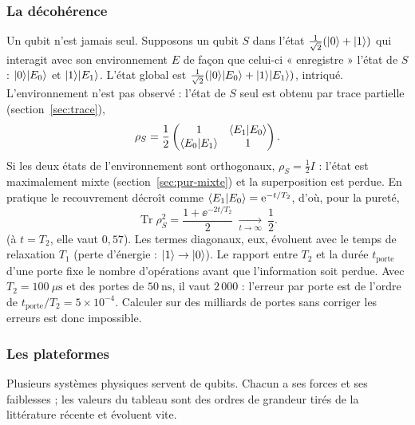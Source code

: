 \subsubsection{La décohérence}

Un qubit n'est jamais seul. Supposons un qubit $S$ dans l'état $\frac{1}{\sqrt2}(|0\rangle+|1\rangle)$ qui interagit
avec son environnement $E$ de façon que celui-ci « enregistre » l'état de $S$ : $|0\rangle|E_0\rangle$ et $|1\rangle|E_1\rangle$.
L'état global est $\frac{1}{\sqrt2}(|0\rangle|E_0\rangle+|1\rangle|E_1\rangle)$, intriqué. L'environnement n'est pas observé : l'état de $S$ seul
est obtenu par trace partielle (section~\ref{sec:trace}),
\[
  \rho_S=\frac12\begin{pmatrix}1&\langle E_1|E_0\rangle\\\langle E_0|E_1\rangle&1\end{pmatrix}.
\]
Si les deux états de l'environnement sont orthogonaux, $\rho_S=\frac12 I$ : l'état est maximalement mixte
(section~\ref{sec:pur-mixte}) et la superposition est perdue. En pratique le recouvrement décroît
comme $\langle E_1|E_0\rangle=\mathrm{e}^{-t/T_2}$, d'où, pour la pureté,
\[
  \operatorname{Tr}\rho_S^2=\frac{1+\ee^{-2t/T_2}}{2}\ \xrightarrow[t\to\infty]{}\ \frac12 .
\]
(à $t=T_2$, elle vaut $0{,}57$). Les termes diagonaux, eux, évoluent avec le temps de relaxation $T_1$ (perte d'énergie : $|1\rangle\to|0\rangle$). Le rapport
entre $T_2$ et la durée $t_{\mathrm{porte}}$ d'une porte fixe le nombre d'opérations avant que l'information soit perdue. Avec
$T_2=100\ \mu\mathrm{s}$ et des portes de $50\ \mathrm{ns}$, il vaut $2\,000$ : l'erreur par porte est de l'ordre de
$t_{\mathrm{porte}}/T_2=5\times10^{-4}$. Calculer sur des milliards de portes sans corriger les erreurs est
donc impossible.

\subsubsection{Les plateformes}

Plusieurs systèmes physiques servent de qubits. Chacun a ses forces et ses faiblesses ; les valeurs du tableau sont des ordres de
grandeur tirés de la littérature récente et évoluent vite.

